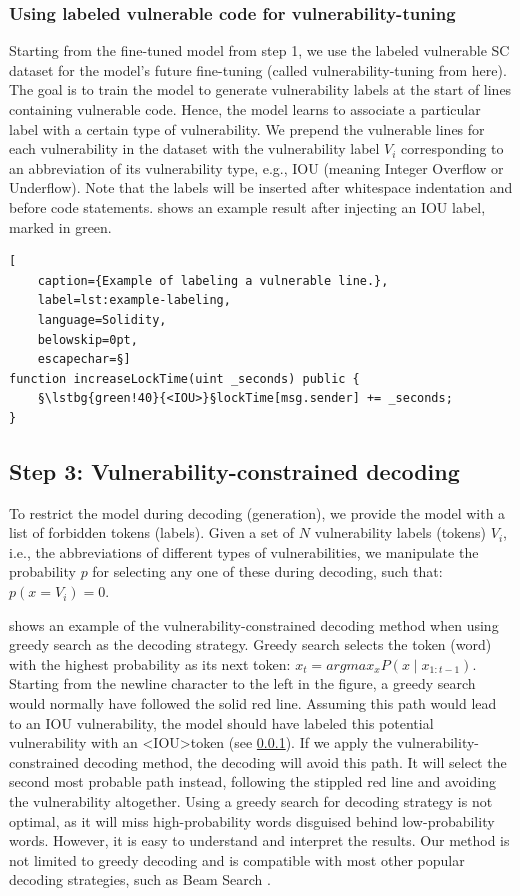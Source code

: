 \documentclass[12pt]{book}
\newcommand{\lstbg}[3][0pt]{{\fboxsep#1\colorbox{#2}{\strut #3}}}
\begin{document}
\subsubsection{Using labeled vulnerable code for vulnerability-tuning}
\label{sec:labeling}

Starting from the fine-tuned model from step 1, we use the labeled vulnerable SC dataset for the model's future fine-tuning (called vulnerability-tuning from here). The goal is to train the model to generate vulnerability labels at the start of lines containing vulnerable code. Hence, the model learns to associate a particular label with a certain type of vulnerability. We prepend the vulnerable lines for each vulnerability in the dataset with the vulnerability label \(V_i\) corresponding to an abbreviation of its vulnerability type, e.g., IOU (meaning Integer Overflow or Underflow). Note that the labels will be inserted after whitespace indentation and before code statements.  shows an example result after injecting an IOU label, marked in green.

\begin{lstlisting}[
    caption={Example of labeling a vulnerable line.},
    label=lst:example-labeling,
    language=Solidity,
    belowskip=0pt,
    escapechar=§]
function increaseLockTime(uint _seconds) public {
    §\lstbg{green!40}{<IOU>}§lockTime[msg.sender] += _seconds;
}
\end{lstlisting}


\subsection{Step 3: Vulnerability-constrained decoding}
To restrict the model during decoding (generation), we provide the model with a list of forbidden tokens (labels). Given a set of \(N\) vulnerability labels (tokens) \(V_i\), i.e., the abbreviations of different types of vulnerabilities, we manipulate the probability \(p\) for selecting any one of these during decoding, such that: \(p(x=V_i)=0\). 

 shows an example of the vulnerability-constrained decoding method when using greedy search as the decoding strategy. Greedy search selects the token (word) with the highest probability as its next token: \(x_t = argmax_xP(x \mid x_{1:t-1}) \). Starting from the newline character to the left in the figure, a greedy search would normally have followed the solid red line. Assuming this path would lead to an IOU vulnerability, the model should have labeled this potential vulnerability with an \textless IOU\textgreater token (see \cref{sec:labeling}). If we apply the vulnerability-constrained decoding method, the decoding will avoid this path. It will select the second most probable path instead, following the stippled red line and avoiding the vulnerability altogether. Using a greedy search for decoding strategy is not optimal, as it will miss high-probability words disguised behind low-probability words. However, it is easy to understand and interpret the results. Our method is not limited to greedy decoding and is compatible with most other popular decoding strategies, such as Beam Search \cite{Freitag_2017}.
\end{document}
